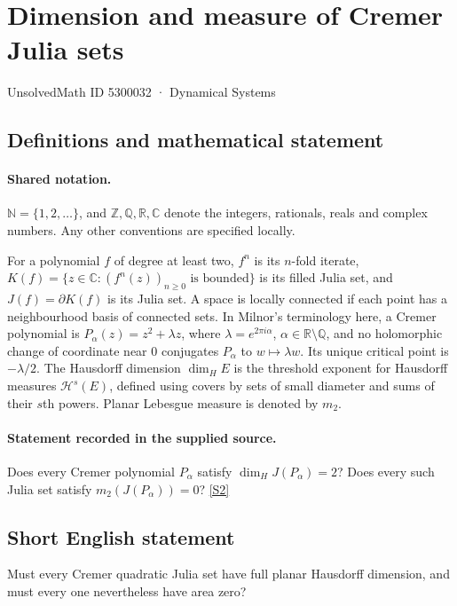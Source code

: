 \documentclass[11pt]{article}
\newcommand{\sref}[2]{\hyperlink{source:#1:#2}{[S#2]}}
\begin{document}
\setcounter{section}{5300031}
\section{Dimension and measure of Cremer Julia sets}\label{5300032}
{\small\sffamily UnsolvedMath ID 5300032 · Dynamical Systems}
\subsection{Definitions and mathematical statement}

\paragraph{Shared notation.}$\mathbb N=\{1,2,\ldots\}$, and $\mathbb Z,\mathbb Q,\mathbb R,\mathbb C$ denote the integers, rationals, reals and complex numbers. Any other conventions are specified locally.


For a polynomial $f$ of degree at least two, $f^n$ is its $n$-fold iterate, $K(f)=\{z\in\mathbb C:(f^n(z))_{n\geq0}\text{ is bounded}\}$ is its filled Julia set, and $J(f)=\partial K(f)$ is its Julia set. A space is locally connected if each point has a neighbourhood basis of connected sets. In Milnor's terminology here, a Cremer polynomial is $P_\alpha(z)=z^2+\lambda z$, where $\lambda=e^{2\pi i\alpha}$, $\alpha\in\mathbb R\setminus\mathbb Q$, and no holomorphic change of coordinate near $0$ conjugates $P_\alpha$ to $w\mapsto\lambda w$. Its unique critical point is $-\lambda/2$. The Hausdorff dimension $\dim_H E$ is the threshold exponent for Hausdorff measures $\mathcal H^s(E)$, defined using covers by sets of small diameter and sums of their $s$th powers. Planar Lebesgue measure is denoted by $m_2$.
\paragraph{Statement recorded in the supplied source.}
Does every Cremer polynomial $P_\alpha$ satisfy $\dim_HJ(P_\alpha)=2$? Does every such Julia set satisfy $m_2(J(P_\alpha))=0$? \sref{5300032}{2}
\subsection{Short English statement}
Must every Cremer quadratic Julia set have full planar Hausdorff dimension, and must every one nevertheless have area zero?
\end{document}
